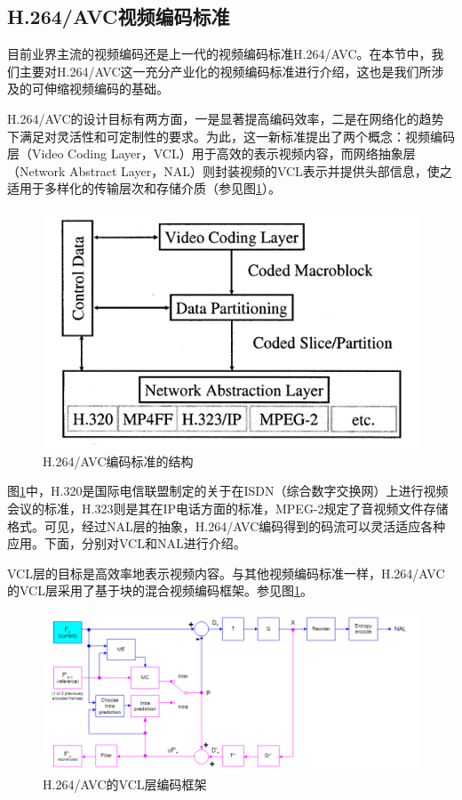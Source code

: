 \subsection{H.264/AVC视频编码标准}

目前业界主流的视频编码还是上一代的视频编码标准H.264/AVC。在本节中，我们主要对H.264/AVC这一充分产业化的视频编码标准进行介绍，这也是我们所涉及的可伸缩视频编码的基础。

H.264/AVC的设计目标有两方面，一是显著提高编码效率，二是在网络化的趋势下满足对灵活性和可定制性的要求。为此，这一新标准提出了两个概念：视频编码层（Video Coding Layer，VCL）用于高效的表示视频内容，而网络抽象层（Network Abstract Layer，NAL）则封装视频的VCL表示并提供头部信息，使之适用于多样化的传输层次和存储介质（参见图\ref{fig:02}）。

\begin{figure}[h]
	\centering
	\includegraphics[width = 0.6\linewidth]{clip/02.png}
	\caption{H.264/AVC编码标准的结构\supercite{H.264-Overview}\label{fig:02}}
\end{figure}

图\ref{fig:02}中，H.320是国际电信联盟制定的关于在ISDN（综合数字交换网）上进行视频会议的标准，H.323则是其在IP电话方面的标准，MPEG-2规定了音视频文件存储格式。可见，经过NAL层的抽象，H.264/AVC编码得到的码流可以灵活适应各种应用。下面，分别对VCL和NAL进行介绍。

VCL层的目标是高效率地表示视频内容。与其他视频编码标准一样，H.264/AVC的VCL层采用了基于块的混合视频编码框架。参见图\ref{fig:02}。

\begin{figure}[h]
	\centering
	\includegraphics[width = 1.0\linewidth]{clip/03.png}
	\caption{H.264/AVC的VCL层编码框架\label{fig:03}}
\end{figure}

